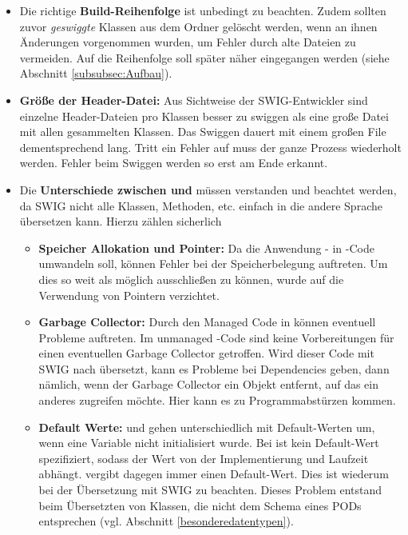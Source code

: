 \begin{itemize}
\item Die richtige \textbf{Build-Reihenfolge} ist unbedingt zu beachten. Zudem sollten zuvor \emph{geswiggte} Klassen aus dem Ordner gelöscht werden, wenn an ihnen Änderungen vorgenommen wurden, um Fehler durch alte Dateien zu vermeiden. Auf die Reihenfolge soll später näher eingegangen werden (siehe Abschnitt \ref{subsubsec:Aufbau}).
\item \textbf{Größe der Header-Datei:} Aus Sichtweise der SWIG-Entwickler sind einzelne Header-Dateien pro Klassen besser zu swiggen als eine große Datei mit allen gesammelten Klassen. Das Swiggen dauert mit einem großen File dementsprechend lang. Tritt ein Fehler auf muss der ganze Prozess wiederholt werden. Fehler beim Swiggen werden so erst am Ende erkannt. %
\item Die \textbf{Unterschiede zwischen \CC und \CS} müssen verstanden und beachtet werden, da SWIG nicht alle Klassen, Methoden, etc. einfach in die andere Sprache übersetzen kann. Hierzu zählen sicherlich 
	\begin{itemize}
	\item \textbf{Speicher Allokation und Pointer:}
	Da die Anwendung \CC - in \CS -Code umwandeln soll, können Fehler bei der Speicherbelegung auftreten. Um dies so weit als möglich ausschließen zu können, wurde auf die Verwendung von Pointern verzichtet.
	\item \textbf{Garbage Collector:} Durch den Managed Code in \CS können eventuell Probleme auftreten. Im unmanaged \CC -Code sind keine Vorbereitungen für einen eventuellen Garbage Collector getroffen. Wird dieser Code mit SWIG nach \CS übersetzt, kann es Probleme bei Dependencies geben, dann nämlich, wenn der Garbage Collector ein Objekt entfernt, auf das ein anderes zugreifen möchte. Hier kann es zu Programmabstürzen kommen.
	\item \textbf{Default Werte:} \CC und \CS gehen unterschiedlich mit Default-Werten um, wenn eine Variable nicht initialisiert wurde. Bei \CC ist kein Default-Wert spezifiziert, sodass der Wert von der Implementierung und Laufzeit abhängt. \CS vergibt dagegen immer einen Default-Wert. Dies ist wiederum bei der Übersetzung mit SWIG zu beachten. Dieses Problem entstand beim Übersetzten von Klassen, die nicht dem Schema eines PODs entsprechen (vgl. Abschnitt \ref{besonderedatentypen}).

\end{itemize}
\end{itemize}
